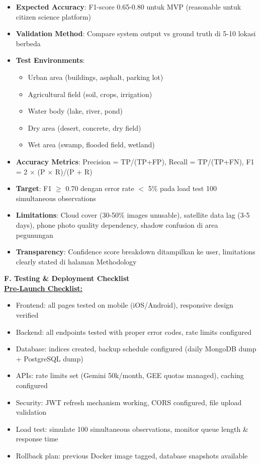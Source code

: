 \documentclass[12pt,a4paper]{article}
\newcommand{\subsectionbox}[1]{%
  \textbf{\large #1}\\[0.3cm]
}
\begin{document}
\begin{itemize}
  \item \textbf{Expected Accuracy}: F1-score 0.65-0.80 untuk MVP (reasonable untuk citizen science platform)
  \item \textbf{Validation Method}: Compare system output vs ground truth di 5-10 lokasi berbeda
  \item \textbf{Test Environments}:
    \begin{itemize}
      \item Urban area (buildings, asphalt, parking lot)
      \item Agricultural field (soil, crops, irrigation)
      \item Water body (lake, river, pond)
      \item Dry area (desert, concrete, dry field)
      \item Wet area (swamp, flooded field, wetland)
    \end{itemize}
  \item \textbf{Accuracy Metrics}: Precision = TP/(TP+FP), Recall = TP/(TP+FN), F1 = 2 $\times$ (P $\times$ R)/(P + R)
  \item \textbf{Target}: F1 $\ge$ 0.70 dengan error rate $<$ 5\% pada load test 100 simultaneous observations
  \item \textbf{Limitations}: Cloud cover (30-50\% images unusable), satellite data lag (3-5 days), phone photo quality dependency, shadow confusion di area pegunungan
  \item \textbf{Transparency}: Confidence score breakdown ditampilkan ke user, limitations clearly stated di halaman Methodology
\end{itemize}

\vspace{0.5cm}

\subsectionbox{F. Testing \& Deployment Checklist}

\textbf{\underline{Pre-Launch Checklist:}}
\begin{itemize}
  \item Frontend: all pages tested on mobile (iOS/Android), responsive design verified
  \item Backend: all endpoints tested with proper error codes, rate limits configured
  \item Database: indices created, backup schedule configured (daily MongoDB dump + PostgreSQL dump)
  \item APIs: rate limits set (Gemini 50k/month, GEE quotas managed), caching configured
  \item Security: JWT refresh mechanism working, CORS configured, file upload validation
  \item Load test: simulate 100 simultaneous observations, monitor queue length \& response time
  \item Rollback plan: previous Docker image tagged, database snapshots available
\end{itemize}
\end{document}
